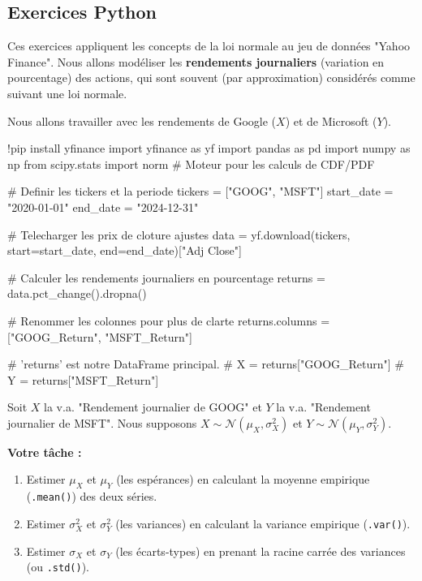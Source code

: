 \subsection{Exercices Python}

Ces exercices appliquent les concepts de la loi normale au jeu de données "Yahoo Finance". Nous allons modéliser les \textbf{rendements journaliers} (variation en pourcentage) des actions, qui sont souvent (par approximation) considérés comme suivant une loi normale.

Nous allons travailler avec les rendements de Google ($X$) et de Microsoft ($Y$).

\begin{codecell}
!pip install yfinance
import yfinance as yf
import pandas as pd
import numpy as np
from scipy.stats import norm # Moteur pour les calculs de CDF/PDF

# Definir les tickers et la periode
tickers = ["GOOG", "MSFT"]
start_date = "2020-01-01"
end_date = "2024-12-31"

# Telecharger les prix de cloture ajustes
data = yf.download(tickers, start=start_date, end=end_date)["Adj Close"]

# Calculer les rendements journaliers en pourcentage
returns = data.pct_change().dropna()

# Renommer les colonnes pour plus de clarte
returns.columns = ["GOOG_Return", "MSFT_Return"]

# 'returns' est notre DataFrame principal.
# X = returns["GOOG_Return"]
# Y = returns["MSFT_Return"]
\end{codecell}

\begin{exercicebox}
Soit $X$ la v.a. "Rendement journalier de GOOG" et $Y$ la v.a. "Rendement journalier de MSFT".
Nous supposons $X \sim \mathcal{N}(\mu_X, \sigma_X^2)$ et $Y \sim \mathcal{N}(\mu_Y, \sigma_Y^2)$.

\textbf{Votre tâche :}
\begin{enumerate}
    \item Estimer $\mu_X$ et $\mu_Y$ (les espérances) en calculant la moyenne empirique (\texttt{.mean()}) des deux séries.
    \item Estimer $\sigma_X^2$ et $\sigma_Y^2$ (les variances) en calculant la variance empirique (\texttt{.var()}).
    \item Estimer $\sigma_X$ et $\sigma_Y$ (les écarts-types) en prenant la racine carrée des variances (ou \texttt{.std()}).
\end{enumerate}
\end{exercicebox}

